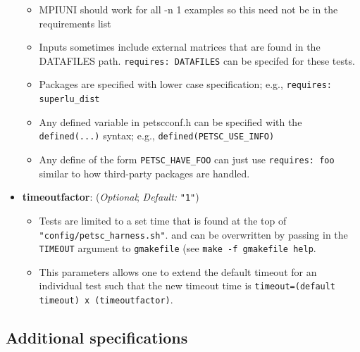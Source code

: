 \begin{itemize}
\begin{itemize}
        \item MPIUNI should work for all -n 1 examples so this need not be in the requirements list

        \item Inputs sometimes include external matrices that are found in the
        DATAFILES path.  \lstinline{requires: DATAFILES} can be specifed for these
        tests.

        \item Packages are specified with lower case specification; e.g.,
        \lstinline{requires: superlu_dist}

        \item Any defined variable in petscconf.h can be specified with the
        \lstinline{defined(...)} syntax; e.g., \lstinline{defined(PETSC_USE_INFO)}

        \item Any define of the form \lstinline{PETSC_HAVE_FOO} can just use
        \lstinline{requires: foo} similar to how third-party packages are handled.

      \end{itemize}

    \item[]  \textbf{timeoutfactor}: (\emph{Optional}; \emph{Default:} \lstinline{"1"})
      \begin{itemize}

        \item Tests are limited to a set time that is found at the top of \lstinline{"config/petsc_harness.sh"}.
              and can be overwritten by passing in the \lstinline{TIMEOUT} argument to \lstinline{gmakefile} (see
              \lstinline{make -f gmakefile help}.

        \item This parameters allows one to extend the default timeout for an individual test such that the new timeout time is \lstinline{timeout=(default timeout) x (timeoutfactor)}.

      \end{itemize}

\end{itemize}



\subsection{Additional specifications%
  \label{additional-specifications}%
}

